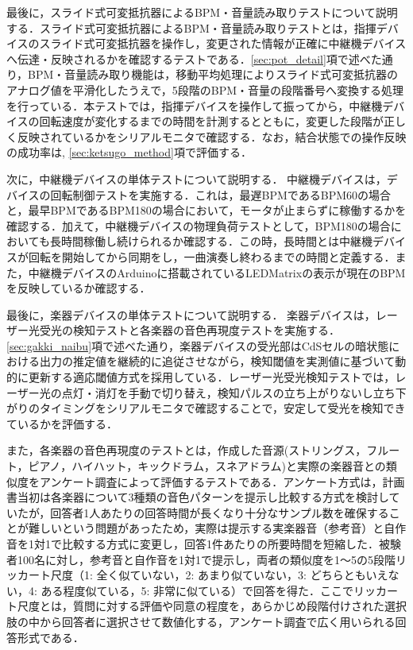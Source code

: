 最後に，スライド式可変抵抗器によるBPM・音量読み取りテストについて説明する．スライド式可変抵抗器によるBPM・音量読み取りテストとは，指揮デバイスのスライド式可変抵抗器を操作し，変更された情報が正確に中継機デバイスへ伝達・反映されるかを確認するテストである．\ref{sec:pot_detail}項で述べた通り，BPM・音量読み取り機能は，移動平均処理によりスライド式可変抵抗器のアナログ値を平滑化したうえで，5段階のBPM・音量の段階番号へ変換する処理を行っている．本テストでは，指揮デバイスを操作して振ってから，中継機デバイスの回転速度が変化するまでの時間を計測するとともに，変更した段階が正しく反映されているかをシリアルモニタで確認する．なお，結合状態での操作反映の成功率は,
\ref{sec:ketsugo_method}項で評価する．


次に，中継機デバイスの単体テストについて説明する．
中継機デバイスは，デバイスの回転制御テストを実施する．これは，最遅BPMであるBPM60の場合と，最早BPMであるBPM180の場合において，モータが止まらずに稼働するかを確認する．加えて，中継機デバイスの物理負荷テストとして，BPM180の場合においても長時間稼働し続けられるか確認する．この時，長時間とは中継機デバイスが回転を開始してから同期をし，一曲演奏し終わるまでの時間と定義する．また，中継機デバイスのArduinoに搭載されているLEDMatrixの表示が現在のBPMを反映しているか確認する．



最後に，楽器デバイスの単体テストについて説明する．
楽器デバイスは，レーザー光受光の検知テストと各楽器の音色再現度テストを実施する．
\ref{sec:gakki_naibu}項で述べた通り，楽器デバイスの受光部はCdSセルの暗状態における出力の推定値を継続的に追従させながら，検知閾値を実測値に基づいて動的に更新する適応閾値方式を採用している．レーザー光受光検知テストでは，レーザー光の点灯・消灯を手動で切り替え，検知パルスの立ち上がりないし立ち下がりのタイミングをシリアルモニタで確認することで，安定して受光を検知できているかを評価する．

また，各楽器の音色再現度のテストとは，作成した音源(ストリングス，フルート，ピアノ，ハイハット，キックドラム，スネアドラム)と実際の楽器音との類似度をアンケート調査によって評価するテストである．アンケート方式は，計画書当初は各楽器について3種類の音色パターンを提示し比較する方式を検討していたが，回答者1人あたりの回答時間が長くなり十分なサンプル数を確保することが難しいという問題があったため，実際は提示する実楽器音（参考音）と自作音を1対1で比較する方式に変更し，回答1件あたりの所要時間を短縮した．被験者100名に対し，参考音と自作音を1対1で提示し，両者の類似度を1〜5の5段階リッカート尺度（1: 全く似ていない，2: あまり似ていない，3: どちらともいえない，4: ある程度似ている，5: 非常に似ている）で回答を得た．ここでリッカート尺度とは，質問に対する評価や同意の程度を，あらかじめ段階付けされた選択肢の中から回答者に選択させて数値化する，アンケート調査で広く用いられる回答形式である．

